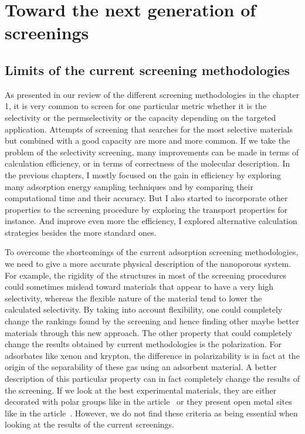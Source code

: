 \documentclass[main]{subfiles}
\begin{document}
\chapter{Toward the next generation of screenings}
\vspace*{-1\baselineskip}

\section{Limits of the current screening methodologies}

As presented in our review of the different screening methodologies in the chapter 1, it is very common to screen for one particular metric whether it is the selectivity or the permselectivity or the capacity depending on the targeted application. Attempts of screening that searches for the most selective materials but combined with a good capacity are more and more common.\autocite{Chung_2019,Zhang_2022,Solanki_2020} If we take the problem of the selectivity screening, many improvements can be made in terms of calculation efficiency, or in terms of correctness of the molecular description. In the previous chapters, I mostly focused on the gain in efficiency by exploring many adsorption energy sampling techniques and by comparing their computational time  and their accuracy. But I also started to incorporate other properties to the screening procedure by exploring the transport properties for instance. And improve even more the efficiency, I explored alternative calculation strategies besides the more standard ones. 

To overcome the shortcomings of the current adsorption screening methodologies, we need to give a more accurate physical description of the nanoporous system. For example, the rigidity of the structures in most of the screening procedures could sometimes mislead toward materials that appear to have a very high selectivity, whereas the flexible nature of the material tend to lower the calculated selectivity. By taking into account flexibility, one could completely change the rankings found by the screening and hence finding other maybe better materials through this new approach. The other property that could completely change the results obtained by current methodologies is the polarization. For adsorbates like xenon and krypton, the difference in polarizability is in fact at the origin of the separability of these gas using an adsorbent material. A better description of this particular property can in fact completely change the results of the screening. If we look at the best experimental materials, they are either decorated with polar groups like in the article~\cite{Li_2019} or they present open metal sites like in the article~\cite{Pei_2022}. However, we do not find these criteria as being essential when looking at the results of the current screenings. 
\end{document}
